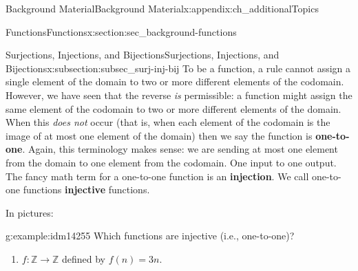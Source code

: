 \documentclass[oneside,10pt,]{book}
\newcommand{\terminology}[1]{\textbf{#1}}
\numberwithin{equation}{chapter}
\def\Z{\mathbb Z}
\begin{document}
\begin{appendixptx}{Background Material}{}{Background Material}{}{}{x:appendix:ch_additionalTopics}
\begin{sectionptx}{Functions}{}{Functions}{}{}{x:section:sec_background-functions}
\begin{subsectionptx}{Surjections, Injections, and Bijections}{}{Surjections, Injections, and Bijections}{}{}{x:subsection:subsec_surj-inj-bij}
To be a function, a rule cannot assign a single element of the domain to two or more different elements of the codomain. However, we have seen that the reverse \emph{is} permissible: a function might assign the same element of the codomain to two or more different elements of the domain. When this \emph{does not} occur (that is, when each element of the codomain is the image of at most one element of the domain) then we say the function is \terminology{one-to-one}. Again, this terminology makes sense: we are sending at most one element from the domain to one element from the codomain. One input to one output. The fancy math term for a one-to-one function is an \terminology{injection}. We call one-to-one functions \terminology{injective} functions.%
\par
In pictures:%
\begin{sidebyside}{2}{0.05}{0.05}{0.1}%
\begin{sbspanel}{0.4}%
%
\end{sbspanel}%
\begin{sbspanel}{0.4}%
%
\end{sbspanel}%
\end{sidebyside}%
\begin{example}{}{g:example:idm14255}%
Which functions are injective (i.e., one-to-one)?%
\par
%
\begin{enumerate}
\item{}\(f:\Z \to \Z\) defined by \(f(n) = 3n\).%

\end{enumerate}
\end{example}
\end{subsectionptx}
\end{sectionptx}
\end{appendixptx}
\end{document}
